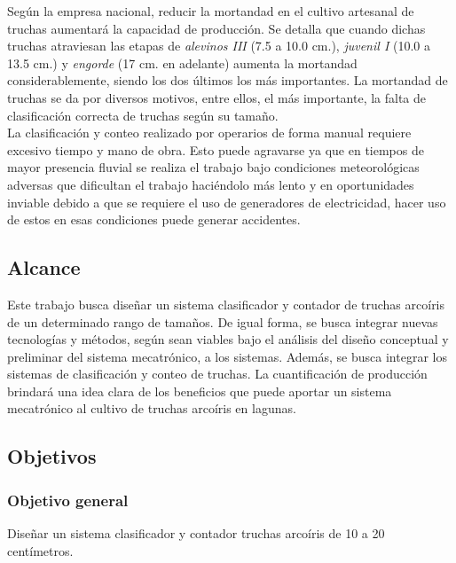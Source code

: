 Según la empresa nacional, reducir la mortandad en el cultivo artesanal de truchas aumentará la capacidad de producción. Se detalla que cuando dichas truchas atraviesan las etapas de \textit{alevinos III} (7.5 a 10.0 cm.), \textit{juvenil I} (10.0 a 13.5 cm.) y \textit{engorde} (17 cm. en adelante) aumenta la mortandad considerablemente, siendo los dos últimos los más importantes. La mortandad de truchas se da por diversos motivos, entre ellos, el más importante, la falta de clasificación correcta de truchas según su tamaño.\\

La clasificación y conteo realizado por operarios de forma manual requiere excesivo tiempo y mano de obra. Esto puede agravarse ya que en tiempos de mayor presencia fluvial se realiza el trabajo bajo condiciones meteorológicas adversas que dificultan el trabajo haciéndolo más lento y en oportunidades inviable debido a que se requiere el uso de generadores de electricidad, hacer uso de estos en esas condiciones puede generar accidentes. \\

\subsection{Alcance}
Este trabajo busca diseñar un sistema clasificador y contador de truchas arcoíris de un determinado rango de tamaños. De igual forma, se busca integrar nuevas tecnologías y métodos, según sean viables bajo el análisis del diseño conceptual y preliminar del sistema mecatrónico, a los sistemas. Además, se busca integrar los sistemas de clasificación y conteo de truchas.
La cuantificación de producción brindará una idea clara de los beneficios que puede aportar un sistema mecatrónico al cultivo de truchas arcoíris en lagunas. \\

\subsection{Objetivos}

\subsubsection{Objetivo general}

Diseñar un sistema clasificador y contador truchas arcoíris de 10 a 20 centímetros.

